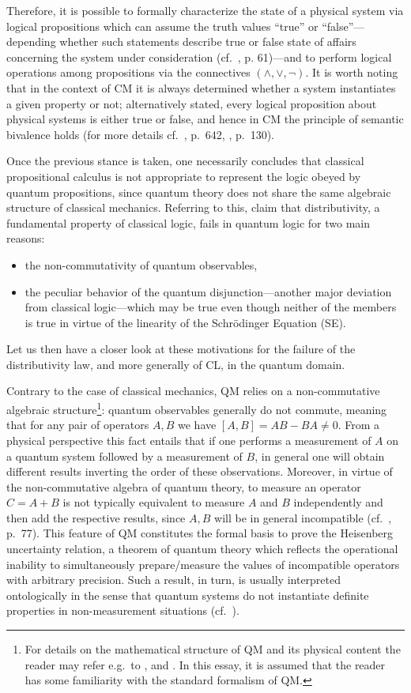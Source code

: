 \documentclass[11pt, executivepaper]{article}
\begin{document}
Therefore, it is possible to formally characterize the state of a physical system via logical propositions which can assume the truth values ``true'' or ``false''---depending whether such statements describe true or false state of affairs concerning the system under consideration (cf.\ \cite{Jaeger:2009}, p. 61)---and to perform logical operations among propositions via the connectives $(\wedge, \vee, \neg)$. It is worth noting that in the context of CM it is always determined whether a system instantiates a given property or not; alternatively stated, every logical proposition about physical systems is either true or false, and hence in CM the principle of semantic bivalence holds (for more details cf.\ \cite{Bub:2007}, p.\ 642, \cite{Giuntini:2002}, p.\ 130).

Once the previous stance is taken, one necessarily concludes that classical propositional calculus is not appropriate to represent the logic obeyed by quantum propositions, since quantum theory does not share the same algebraic structure of classical mechanics. Referring to this, \cite{Giuntini:2002} claim that distributivity, a fundamental property of classical logic, fails in quantum logic for two main reasons:
\begin{itemize}
	\item the non-commutativity of quantum observables,
	\item the peculiar behavior of the quantum disjunction---another major deviation from classical logic---which may be true even though neither of the members is true in virtue of the linearity of the Schr\"odinger Equation (SE). 
\end{itemize}
\noindent Let us then have a closer look at these motivations for the failure of the distributivity law, and more generally of CL, in the quantum domain.

Contrary to the case of classical mechanics, QM relies on a non-commutative algebraic structure\footnote{For details on the mathematical structure of QM and its physical content the reader may refer e.g.\ to \cite{Sakurai1994}, and \cite{Griffiths:2014}. In this essay, it is assumed that the reader has some familiarity with the standard formalism of QM.}: quantum observables generally do not commute, meaning that for any pair of operators $A,B$ we have $[A,B]=AB-BA\neq0$. From a physical perspective this fact entails that if one performs a measurement of $A$ on a quantum system followed by a measurement of $B$, in general one will obtain different results inverting the order of these observations. Moreover, in virtue of the non-commutative algebra of quantum theory, to measure an operator $C=A+B$ is not typically equivalent to measure $A$ and $B$ independently and then add the respective results, since $A,B$ will be in general incompatible (cf.\ \cite{David:2015}, p.\ 77). This feature of QM constitutes the formal basis to prove the Heisenberg uncertainty relation, a theorem of quantum theory which reflects the operational inability to simultaneously prepare/measure the values of incompatible operators with arbitrary precision. Such a result, in turn, is usually interpreted ontologically in the sense that quantum systems do not instantiate definite properties in non-measurement situations (cf.\ \cite{Sakurai1994}).
\end{document}

